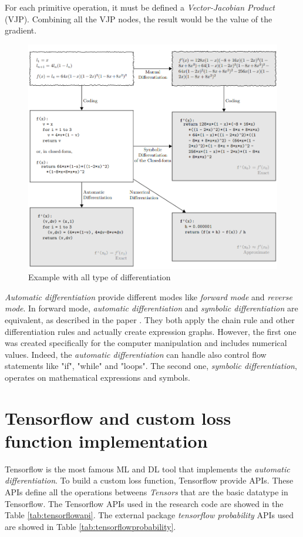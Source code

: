 \documentclass[12pt]{report}
\begin{document}
%
For each primitive operation, it must be defined a \textit{Vector-Jacobian Product} (VJP). 
Combining all the VJP nodes, the result would be the value of the gradient.

\begin{figure}[t]
    \centering
    \includegraphics[scale=.4]{differentiations.png}
    \caption{Example with all type of differentiation \cite{autodiff}}
    \label{fig:differentiations}
\end{figure}

\textit{Automatic differentiation} provide different modes like \textit{forward mode} and \textit{reverse mode}.
In forward mode, \textit{automatic differentiation} and \textit{symbolic differentiation} are equivalent, as described in the paper \cite{auto_symbol}.
They both apply the chain rule and other differentiation rules and actually create expression graphs.
However, the first one was created specifically for the computer manipulation and includes numerical values. 
Indeed, the \textit{automatic differentiation} can handle also control flow statements like "if", "while" and "loops".
The second one, \textit{symbolic differentiation}, operates on mathematical expressions and symbols.

\section{Tensorflow and custom loss function implementation}
Tensorflow is the most famous ML and DL tool that implements the \textit{automatic differentiation}.
To build a custom loss function, Tensorflow provide APIs. These APIs define all the operations betweens \textit{Tensors} that are the basic datatype in Tensorflow.
The Tensorflow APIs used in the research code are showed in the Table \ref{tab:tensorflowapi}.
The external package \textit{tensorflow probability} APIs used are showed in Table \ref{tab:tensorflowprobability}.
\end{document}
